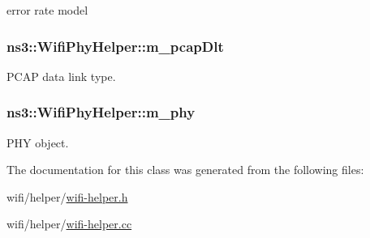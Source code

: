 error rate model 

\subsubsection[{\texorpdfstring{m\+\_\+pcap\+Dlt}{m_pcapDlt}}]{ ns3\+::\+Wifi\+Phy\+Helper\+::m\+\_\+pcap\+Dlt\hspace{0.3cm}{\ttfamily [private]}}\hypertarget{classns3_1_1WifiPhyHelper_a5d28515f3c747bf279568538546bb2a2}{}\label{classns3_1_1WifiPhyHelper_a5d28515f3c747bf279568538546bb2a2}


P\+C\+AP data link type. 

\subsubsection[{\texorpdfstring{m\+\_\+phy}{m_phy}}]{ ns3\+::\+Wifi\+Phy\+Helper\+::m\+\_\+phy\hspace{0.3cm}{\ttfamily [protected]}}\hypertarget{classns3_1_1WifiPhyHelper_ae3b07648ffcc4ad9bd82087c826aaf1b}{}\label{classns3_1_1WifiPhyHelper_ae3b07648ffcc4ad9bd82087c826aaf1b}


P\+HY object. 



The documentation for this class was generated from the following files\+:\begin{DoxyCompactItemize}
\item 
wifi/helper/\hyperlink{wifi-helper_8h}{wifi-\/helper.\+h}\item 
wifi/helper/\hyperlink{wifi-helper_8cc}{wifi-\/helper.\+cc}\end{DoxyCompactItemize}
